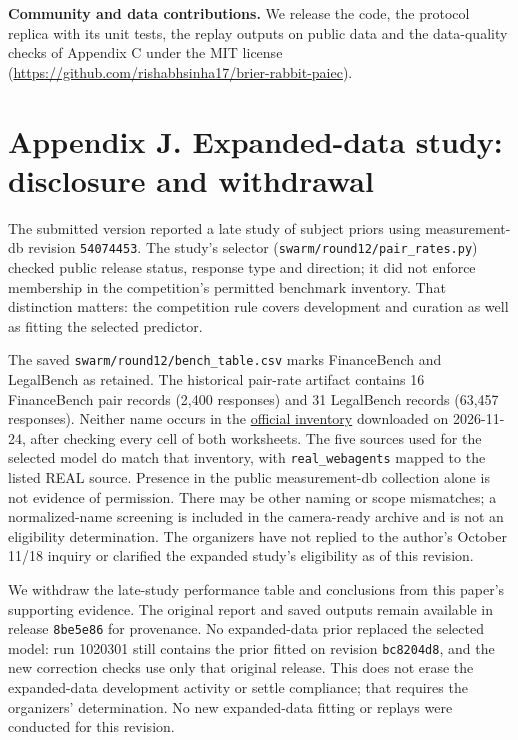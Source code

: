 \documentclass[
]{article}
\begin{document}
\textbf{Community and data contributions.} We release the code, the
protocol replica with its unit tests, the replay outputs on public data
and the data-quality checks of Appendix C under the MIT license
(\url{https://github.com/rishabhsinha17/brier-rabbit-paiec}).

\section{Appendix J. Expanded-data study: disclosure and
withdrawal}\label{appendix-j.-expanded-data-study-disclosure-and-withdrawal}

The submitted version reported a late study of subject priors using
measurement-db revision \texttt{54074453}. The study's selector
(\texttt{swarm/round12/pair\_rates.py}) checked public release status,
response type and direction; it did not enforce membership in the
competition's permitted benchmark inventory. That distinction matters:
the competition rule covers development and curation as well as fitting
the selected predictor.

The saved \texttt{swarm/round12/bench\_table.csv} marks FinanceBench and
LegalBench as retained. The historical pair-rate artifact contains 16
FinanceBench pair records (2,400 responses) and 31 LegalBench records
(63,457 responses). Neither name occurs in the
\href{https://docs.google.com/spreadsheets/d/1T69QyIZJRWX3d-Tmuh_lcFwtpqv9ytcLxfLWKn6gopI/edit}{official
inventory} downloaded on 2026-11-24, after checking every cell of both
worksheets. The five sources used for the selected model do match that
inventory, with \texttt{real\_webagents} mapped to the listed REAL
source. Presence in the public measurement-db collection alone is not
evidence of permission. There may be other naming or scope mismatches; a
normalized-name screening is included in the camera-ready archive and is
not an eligibility determination. The organizers have not replied to the
author's October 11/18 inquiry or clarified the expanded study's
eligibility as of this revision.

We withdraw the late-study performance table and conclusions from this
paper's supporting evidence. The original report and saved outputs
remain available in release \texttt{8be5e86} for provenance. No
expanded-data prior replaced the selected model: run 1020301 still
contains the prior fitted on revision \texttt{bc8204d8}, and the new
correction checks use only that original release. This does not erase
the expanded-data development activity or settle compliance; that
requires the organizers' determination. No new expanded-data fitting or
replays were conducted for this revision.
\end{document}
